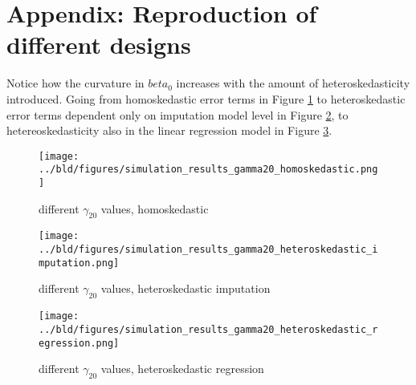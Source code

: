 \newpage

\appendix
\section{Appendix: Reproduction of different designs}

Notice how the curvature in $beta_0$ increases with the amount of heteroskedasticity introduced.
Going from homoskedastic error terms in Figure \ref{fig:gamma20_homoskedastic} to heteroskedastic error terms dependent only on  imputation model level in Figure \ref{fig:gamma20_heteroskedastic_imputation}, to hetereoskedasticity also in the linear regression model in Figure \ref{fig:gamma20_heteroskedastic_regression}.

\begin{figure}
    \centering
    \texttt{[image: ../bld/figures/simulation\_results\_gamma20\_homoskedastic.png]}
    \caption{different $\gamma_{20}$ values, homoskedastic}
    \label{fig:gamma20_homoskedastic}
\end{figure}

\begin{figure}
    \centering
    \texttt{[image: ../bld/figures/simulation\_results\_gamma20\_heteroskedastic\_imputation.png]}
    \caption{different $\gamma_{20}$ values, heteroskedastic imputation}
    \label{fig:gamma20_heteroskedastic_imputation}
\end{figure}

\begin{figure}
    \centering
    \texttt{[image: ../bld/figures/simulation\_results\_gamma20\_heteroskedastic\_regression.png]}
    \caption{different $\gamma_{20}$ values, heteroskedastic regression}
    \label{fig:gamma20_heteroskedastic_regression}
\end{figure}

\iffalse








\fi
